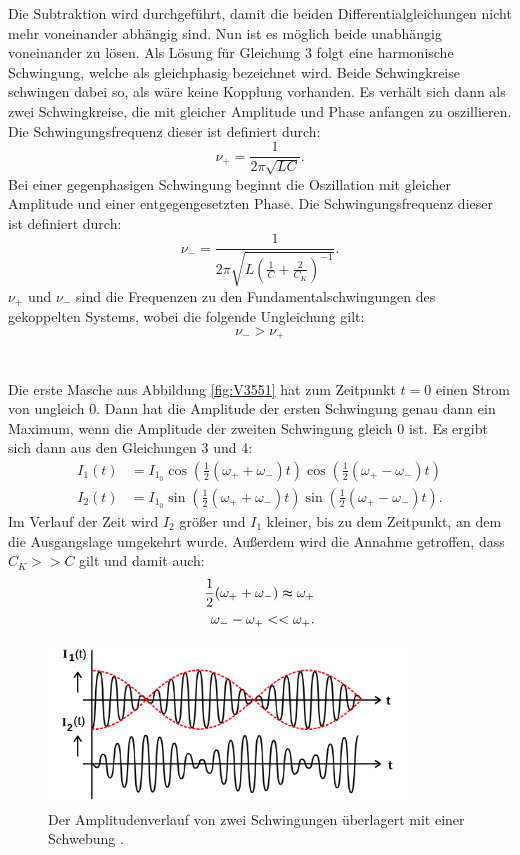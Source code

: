 \documentclass[
  bibliography=totoc,     %
  captions=tableheading,  %
  titlepage=firstiscover, %
]{scrartcl}
\begin{document}
Die Subtraktion wird durchgeführt, damit die beiden Differentialgleichungen nicht
mehr voneinander abhängig sind. Nun ist es möglich beide unabhängig voneinander
zu lösen. Als Lösung für Gleichung 3 folgt eine harmonische Schwingung, welche
als gleichphasig bezeichnet wird. Beide Schwingkreise schwingen dabei so, als
wäre keine Kopplung vorhanden. Es verhält sich dann als zwei Schwingkreise, die
mit gleicher Amplitude und Phase anfangen zu oszillieren. Die
Schwingungsfrequenz dieser ist definiert durch:
\begin{equation}
  \nu_+=\frac{1}{2\pi\sqrt{LC}}.
  \label{eqn:gleichph}
\end{equation}
Bei einer gegenphasigen Schwingung beginnt die Oszillation mit gleicher
Amplitude und einer entgegengesetzten Phase. Die Schwingungsfrequenz dieser
ist definiert durch:
\begin{equation}
  \nu_-=\frac{1}{2\pi\sqrt{L(\frac{1}{C}+\frac{2}{C_K})^{-1}}}.
  \label{eqn:gegenph}
\end{equation}
$\nu_+$ und $\nu_-$ sind die Frequenzen zu den Fundamentalschwingungen des
gekoppelten Systems, wobei die folgende Ungleichung gilt:
\begin{equation}
  \nu_->\nu_+
\end{equation} \\
\\
Die erste Masche aus Abbildung \ref{fig:V3551} hat zum Zeitpunkt $t=0$ einen
Strom von ungleich 0. Dann hat die Amplitude der ersten Schwingung genau dann
ein Maximum, wenn die Amplitude der zweiten Schwingung gleich 0 ist. Es
ergibt sich dann aus den Gleichungen 3 und 4:
\begin{align}
  I_1(t) &=I_{1_0}\cos(\frac{1}{2}(\omega_++\omega_-)t)\cos(\frac{1}{2}(\omega_+-\omega_-)t) \\
  I_2(t) &=I_{1_0}\sin(\frac{1}{2}(\omega_++\omega_-)t)\sin(\frac{1}{2}(\omega_+-\omega_-)t).
\end{align}
Im Verlauf der Zeit wird $I_2$ größer und $I_1$ kleiner, bis zu dem Zeitpunkt, an
dem die Ausgangslage umgekehrt wurde. Außerdem wird die Annahme getroffen, dass
$C_K>>C$ gilt und damit auch:
\begin{align}
  \label{eqn:swing}
  \frac{1}{2}(\omega_++\omega_-)\thickapprox\omega_+ \\
  \omega_--\omega_+<<\omega_+.
\end{align}
\begin{figure}[htb]
  \centering
  \includegraphics[width=0.85\textwidth]{V3552.png}
  \caption{Der Amplitudenverlauf von zwei Schwingungen überlagert mit einer Schwebung \cite{anleitung}.}
  \label{fig:V3552}
\end{figure}
\end{document}
